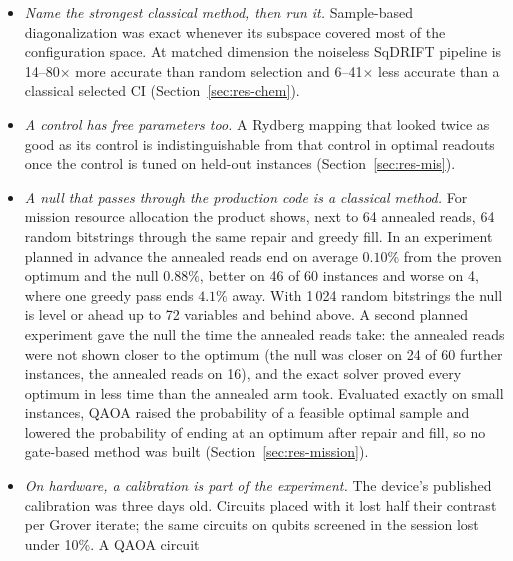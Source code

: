 \documentclass[11pt,a4paper]{article}
\begin{document}
\begin{itemize}
        BF-DCQO and PCE return the optimum in every capped run, and so do
        their nulls: a classical search decides. And on the product's
        default path the displayed portfolio is the one the classical
        weighting computes without any selection in 138 of 150 QAOA runs
        (Section~\ref{sec:res-portfolio2}).
  \item \emph{Name the strongest classical method, then run it.}
        Sample-based diagonalization was exact whenever its subspace covered
        most of the configuration space. At matched dimension the noiseless
        SqDRIFT pipeline is 14--80$\times$ more accurate than random
        selection and 6--41$\times$ less accurate than a classical selected
        CI (Section~\ref{sec:res-chem}).
  \item \emph{A control has free parameters too.} A Rydberg mapping that
        looked twice as good as its control is indistinguishable from that
        control in optimal readouts once the control is tuned on held-out
        instances (Section~\ref{sec:res-mis}).
  \item \emph{A null that passes through the production code is a classical
        method.} For mission resource allocation the product shows, next to
        64 annealed reads, 64 random bitstrings through the same repair and
        greedy fill. In an experiment planned in advance the annealed reads
        end on average $0.10\%$ from the proven optimum and the null
        $0.88\%$, better
        on 46 of 60 instances and worse on 4, where one greedy pass ends
        $4.1\%$ away. With 1\,024 random bitstrings the null is level or
        ahead up to 72 variables and behind above. A second planned
        experiment gave the null the time the annealed reads take: the
        annealed reads were not shown closer to the optimum (the null was
        closer on 24 of 60 further instances, the annealed reads on 16),
        and the exact solver proved every optimum in less time than the
        annealed arm took. Evaluated exactly on
        small instances, QAOA raised the probability of a feasible optimal
        sample and lowered the probability of ending at an optimum after
        repair and fill, so no gate-based method was built
        (Section~\ref{sec:res-mission}).
  \item \emph{On hardware, a calibration is part of the experiment.} The
        device's published calibration was three days old. Circuits placed
        with it lost half their contrast per Grover iterate; the same
        circuits on qubits screened in the session lost under 10\%. A QAOA circuit

\end{itemize}
\end{document}

